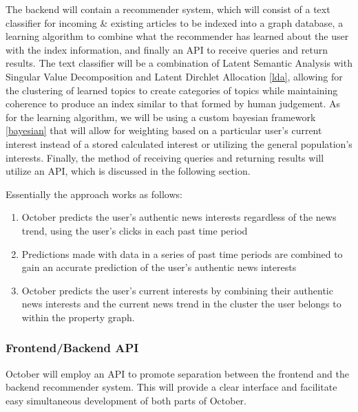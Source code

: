 \documentclass[11pt,letterpaper]{article}
\begin{document}
The backend will contain a recommender system, which will consist of a text classifier for incoming \& existing articles to be indexed into a graph database, a learning algorithm to combine what the recommender has learned about the user with the index information, and finally an API to receive queries and return results. The text classifier will be a combination of Latent Semantic Analysis with Singular Value Decomposition and Latent Dirchlet Allocation \ref{lda}, allowing for the clustering of learned topics to create categories of topics while maintaining coherence to produce an index similar to that formed by human judgement. As for the learning algorithm, we will be using a custom bayesian framework \ref{bayesian} that will allow for weighting based on a particular user's current interest instead of a stored calculated interest or utilizing the general population's interests.
Finally, the method of receiving queries and returning results will utilize an API, which is discussed in the following section.

Essentially the approach works as follows: 
    \begin{enumerate}
        \item October predicts the user’s authentic news interests regardless of the news trend, using the user’s clicks in each past time period
        \item Predictions made with data in a series of past time periods are combined to gain an accurate prediction of the user’s authentic news interests
        \item October predicts the user’s current interests by combining their authentic news interests and the current news trend in the cluster the user belongs to within the property graph.
    \end{enumerate}
    
\subsubsection{Frontend/Backend API}
October will employ an API to promote separation between the frontend and the backend recommender system.
This will provide a clear interface and facilitate easy simultaneous development of both parts of October.
\end{document}
